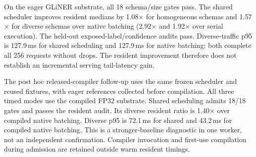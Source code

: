 On the eager GLiNER substrate, all 18 schema/size gates pass. The shared scheduler improves resident medians by 1.08$\times$ for homogeneous schemas and 1.57$\times$ for diverse schemas over native batching (2.92$\times$ and 1.92$\times$ over serial execution). The held-out exposed-label/confidence audits pass. Diverse-traffic p95 is 127.9\,ms for shared scheduling and 127.9\,ms for native batching; both complete all 256 requests without drops. The resident improvement therefore does not establish an incremental serving tail-latency gain.

The post hoc released-compiler follow-up uses the same frozen scheduler and reused fixtures, with eager references collected before compilation. All three timed modes use the compiled FP32 substrate. Shared scheduling admits 18/18 gates and passes the resident audit. Its diverse resident ratio is 1.40$\times$ over compiled native batching. Diverse p95 is 72.1\,ms for shared and 43.2\,ms for compiled native batching. This is a stronger-baseline diagnostic in one worker, not an independent confirmation. Compiler invocation and first-use compilation during admission are retained outside warm resident timings.
